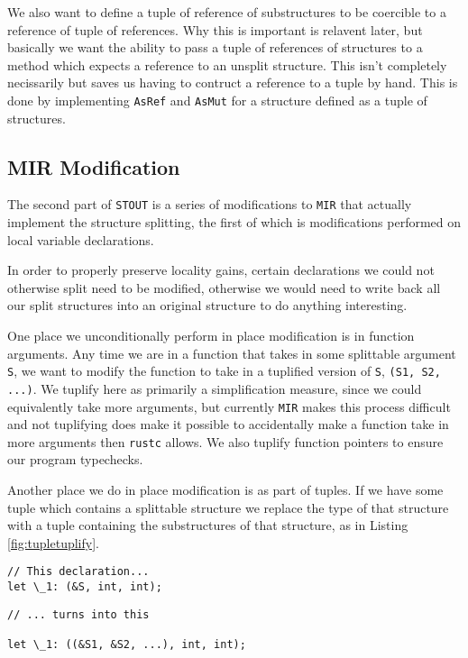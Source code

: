 \documentclass[prodmode,acmtecs]{acmsmall} %
\newcommand{\rustcname}{{\texttt{rustc}}}
\def \rustc {\rustcname{}\xspace}
\newcommand{\mirname}{{\texttt{MIR}}}
\def \mir {\mirname{}\xspace}
\newcommand{\projectname}{{\texttt{STOUT}}}
\def \name{\projectname\xspace}
\begin{document}
We also want to define a tuple of reference of substructures 
to be coercible to a reference of tuple of references. Why this is 
important is relavent later, but basically
we want the ability to pass a tuple of references 
of structures to a method which expects a reference to an 
unsplit structure. This isn't completely necissarily but 
saves us having to contruct a reference to a tuple by hand.
This is done by implementing \texttt{AsRef} and \texttt{AsMut}
for a structure defined as a tuple of structures.

\subsection{MIR Modification}

The second part of \name is a series of modifications to \mir that actually
implement the structure splitting, the first of which is modifications performed on
local variable declarations.

In order to properly preserve locality gains, certain declarations
we could not otherwise split need to be modified, otherwise we would need
to write back all our split structures into an original structure to
do anything interesting.

One place we unconditionally perform in place modification is in function
arguments. Any time we are in a function that takes in some splittable
argument \texttt{S}, we want to modify the function to take 
in a tuplified version of \texttt{S}, \texttt{(S1, S2, ...)}. 
We tuplify here as primarily a simplification measure, since 
we could equivalently take more arguments, but currently
\mir makes this process difficult and
not tuplifying does make it possible to accidentally make a function
take in more arguments then \rustc allows.
We also tuplify function pointers to ensure our program typechecks.

Another place we do in place modification is as part of tuples. If we have some
tuple which contains a splittable structure we replace the type of that
structure with a tuple containing the substructures of that structure, as 
in Listing \ref{fig:tupletuplify}.

\begin{figure*}[p]
  \begin{minipage}[t]{0.5\linewidth}
\begin{verbatim}
// This declaration...
let \_1: (&S, int, int);
\end{verbatim}
  \end{minipage}
  \begin{minipage}[t]{0.5\linewidth}
\begin{verbatim}
// ... turns into this

let \_1: ((&S1, &S2, ...), int, int);
\end{verbatim}
  \end{minipage}
  \caption{Tuple Modification}
  \label{fig:tupletuplify}
\end{figure*}
\end{document}
